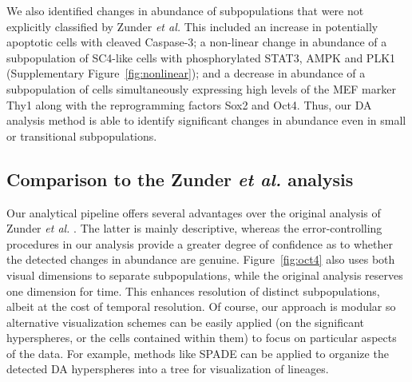 \documentclass{article}
\begin{document}
We also identified changes in abundance of subpopulations that were not explicitly classified by Zunder \emph{et al.}
This included an increase in potentially apoptotic cells with cleaved Caspase-3;
a non-linear change in abundance of a subpopulation of SC4-like cells with phosphorylated STAT3, AMPK and PLK1 (Supplementary Figure~\ref{fig:nonlinear});
and a decrease in abundance of a subpopulation of cells simultaneously expressing high levels of the MEF marker Thy1 along with the reprogramming factors Sox2 and Oct4.
Thus, our DA analysis method is able to identify significant changes in abundance even in small or transitional subpopulations.

\subsection{Comparison to the Zunder \textit{et al.} analysis}
Our analytical pipeline offers several advantages over the original analysis of Zunder \emph{et al.} \cite{zunder2015continuous}.
The latter is mainly descriptive, whereas the error-controlling procedures in our analysis provide a greater degree of confidence as to whether the detected changes in abundance are genuine.
Figure~\ref{fig:oct4} also uses both visual dimensions to separate subpopulations, while the original analysis reserves one dimension for time.
This enhances resolution of distinct subpopulations, albeit at the cost of temporal resolution.
Of course, our approach is modular so alternative visualization schemes can be easily applied (on the significant hyperspheres, or the cells contained within them) to focus on particular aspects of the data.
For example, methods like SPADE can be applied to organize the detected DA hyperspheres into a tree for visualization of lineages.
\end{document}
